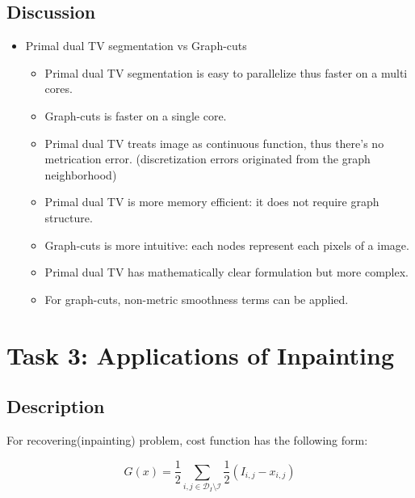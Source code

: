 \documentclass[paper=a4, fontsize=11pt]{scrartcl} %
\numberwithin{equation}{section} %
\numberwithin{figure}{section} %
\numberwithin{table}{section} %
\begin{document}
\subsection{Discussion}

\begin{itemize}
	\item Primal dual TV segmentation vs Graph-cuts
		\begin{itemize} 
			\item Primal dual TV segmentation is easy to parallelize thus faster on a multi cores. 
			\item Graph-cuts is faster on a single core.
			\item Primal dual TV treats image as continuous function, thus there's no metrication error. (discretization errors originated from the graph neighborhood)
			\item Primal dual TV is more memory efficient: it does not require graph structure.
			\item Graph-cuts is more intuitive: each nodes represent each pixels of a image. 
			\item Primal dual TV has mathematically clear formulation but more complex. 
			\item For graph-cuts, non-metric smoothness terms can be applied. 
		\end{itemize}
\end{itemize}

\pagebreak


\section{Task 3: Applications of Inpainting}

\subsection{Description}

For recovering(inpainting) problem, cost function has the following form:

\begin{equation}
	G(x) = \frac{1}{2} \sum_{i, j \in \mathcal{D}_I \setminus \mathcal{I}} \frac{1}{2} (I_{i,j} - x_{i,j})
\end{equation}
\end{document}
